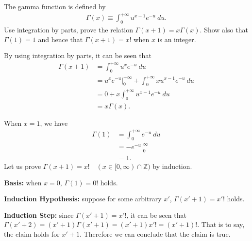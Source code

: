 \begin{question}{1.17}
	The gamma function is defined by
	\begin{align*}
		\Gamma(x) \equiv \int_{0}^{+\infty} u^{x-1} e^{-u}\ du.
	\end{align*}
	Use integration by parts, prove the relation $\Gamma(x + 1) = x \Gamma(x).$ Show also that $\Gamma(1) = 1$ and hence that $\Gamma(x + 1) = x!$ when $x$ is an integer.
\end{question}

\begin{answer}{}
	By using integration by parts, it can be seen that
	\begin{align}
		\Gamma(x + 1) &= \int_{0}^{+\infty} u^{x} e^{-u}\ du\\
		&= \left.u^x e^{-u}\right\rvert^{+\infty}_{0} + \int_{0}^{+\infty} xu^{x - 1} e^{-u}\ du\\
		&= 0 + x\int_{0}^{+\infty} u^{x - 1} e^{-u}\ du\\
		&= x\Gamma(x).
	\end{align}
	
	When $x = 1$, we have
	\begin{align}
		\Gamma(1) &= \int_{0}^{+\infty} e^{-u}\ du\\
		&= \left.-e^{-u}\right\rvert_{0}^{\infty}\\
		&= 1.
	\end{align}
	Let us prove $\Gamma(x + 1) = x!\quad(x \in [0, \infty) \cap \mathbb{Z})$ by induction.
	
	\noindent\textbf{Basis:} when $x = 0$, $\Gamma(1) = 0!$ holds.
	
	\noindent\textbf{Induction Hypothesis:} suppose for some arbitrary $x'$, $\Gamma(x' + 1) = x'!$ holds.
	
	\noindent\textbf{Induction Step:} since $\Gamma(x' + 1) = x'!$, it can be seen that $\Gamma(x' + 2) = (x' + 1)\Gamma(x' + 1) = (x' + 1)x'! = (x' + 1)!$. That is to say, the claim holds for $x' + 1$. Therefore we can conclude that the claim is true.
\end{answer}